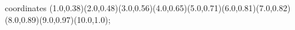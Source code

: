 					coordinates { (1.0,0.38)(2.0,0.48)(3.0,0.56)(4.0,0.65)(5.0,0.71)(6.0,0.81)(7.0,0.82)(8.0,0.89)(9.0,0.97)(10.0,1.0)};